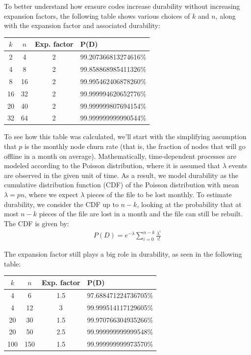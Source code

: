 \documentclass[8pt,fleqn,openany]{book}
\begin{document}
To better understand how erasure codes increase durability without
increasing expansion factors, the following table shows various choices of
$k$ and $n$, along with the expansion factor and associated durability:

\begin{center}
\begin{tabular}{c c c l}
$k$ & $n$ & Exp. factor & P(D) \\ \hline
2 & 4 & 2 & 99.207366813274616\%\\
4 & 8 & 2 & 99.858868985411326\%\\
8 & 16 & 2 & 99.995462406878260\%\\
16 & 32 & 2 & 99.999994620652776\%\\
20 & 40 & 2 & 99.999999807694154\%\\
32 & 64 & 2 & 99.999999999990544\%\\
\end{tabular}
\end{center}

To see how this table was calculated, we'll start
with the simplifying assumption that $p$ is the monthly node
churn rate (that is, the fraction of nodes that will go offline in a month on
average). Mathematically, time-dependent processes are modeled according to
the Poisson distribution, where it is assumed that $\lambda$ events are
observed in the given unit of time.
As a result, we model durability
as the cumulative distribution function (CDF) of the Poisson distribution with mean $\lambda=pn$,
where we expect $\lambda$ pieces of the file to be lost monthly.
To estimate
durability, we consider the CDF up to $n-k$,
looking at the probability that at most $n-k$ pieces
of the file are lost in a month and the file can still be rebuilt.
The CDF is given by:
\begin{align*}
 && P(D) = e^{-\lambda} \sum_{i=0}^{n-k} \frac{\lambda^i}{i!} &&
\end{align*}

The expansion factor still plays a big role in durability, as seen in the
following table:

\begin{center}
\begin{tabular}{c c c l}
$k$ & $n$ & Exp. factor & P(D) \\ \hline
4 & 6 & 1.5 & 97.688471224736705\%\\
4 & 12 & 3 & 99.999514117129605\%\\
20 & 30 & 1.5 & 99.970766304935266\%\\
20 & 50 & 2.5 & 99.999999999999548\%\\
100 & 150 & 1.5 & 99.999999999973570\%\\
\end{tabular}
\end{center}
\end{document}
